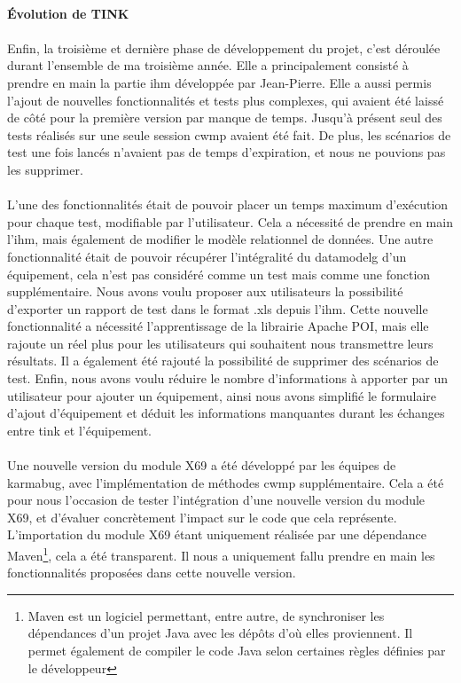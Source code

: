 \documentclass[12pt,a4paper]{report}
\begin{document}
\paragraph{Évolution de TINK}
\paragraph*{}Enfin, la troisième et dernière phase de développement du projet, c'est déroulée durant l'ensemble de ma troisième année. Elle a principalement consisté à prendre en main la partie \gls{ihm} développée par Jean-Pierre. Elle a aussi permis l'ajout de nouvelles fonctionnalités et tests plus complexes, qui avaient été laissé de côté pour la première version par manque de temps. Jusqu'à présent seul des tests réalisés sur une seule session \gls{cwmp} avaient été fait. De plus, les scénarios de test une fois lancés n'avaient pas de temps d'expiration, et nous ne pouvions pas les supprimer. 
\paragraph*{}L'une des fonctionnalités était de pouvoir placer un temps maximum d'exécution pour chaque test, modifiable par l'utilisateur. Cela a nécessité de prendre en main l'\gls{ihm}, mais également de modifier le modèle relationnel de données. Une autre fonctionnalité était de pouvoir récupérer l'intégralité du \gls{datamodelg} d'un équipement, cela n'est pas considéré comme un test mais comme une fonction supplémentaire. Nous avons voulu proposer aux utilisateurs la possibilité d'exporter un rapport de test dans le format .xls depuis l'\gls{ihm}. Cette nouvelle fonctionnalité a nécessité l'apprentissage de la librairie Apache POI, mais elle rajoute un réel plus pour les utilisateurs qui souhaitent nous transmettre leurs résultats. Il a également été rajouté la possibilité de supprimer des scénarios de test. Enfin, nous avons voulu réduire le nombre d'informations à apporter par un utilisateur pour ajouter un équipement, ainsi nous avons simplifié le formulaire d'ajout d'équipement et déduit les informations manquantes durant les échanges entre \gls{tink} et l'équipement. 
\paragraph*{}Une nouvelle version du module X69 a été développé par les équipes de \gls{karmabug}, avec l'implémentation de méthodes \gls{cwmp} supplémentaire. Cela a été pour nous l'occasion de tester l'intégration d'une nouvelle version du module X69, et d'évaluer concrètement l'impact sur le code que cela représente. L'importation du module X69 étant uniquement réalisée par une dépendance Maven\footnote{Maven est un logiciel permettant, entre autre, de synchroniser les dépendances d'un projet Java avec les dépôts d'où elles proviennent. Il permet également de compiler le code Java selon certaines règles définies par le développeur}, cela a été transparent. Il nous a uniquement fallu prendre en main les fonctionnalités proposées dans cette nouvelle version. 
\end{document}
